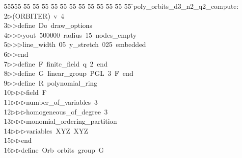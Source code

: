 %
%
\begin{tabbing}
55555 \= 55 \= 55 \= 55 \= 55 \= 55 \= 55 \= 55 \= 55 \= 55 \= 55 \= 55 \= 55 \= \>poly\_orbits\_d3\_n2\_q2\_compute:\\[0pt]
2\>$\triangleright$\>(ORBITER)\ v\ 4\ \\[0pt]
3\>$\triangleright$\>$\triangleright$\>define\ Do\ draw\_options\ \\[0pt]
4\>$\triangleright$\>$\triangleright$\>$\triangleright$\>yout\ 500000\ radius\ 15\ nodes\_empty\ \\[0pt]
5\>$\triangleright$\>$\triangleright$\>$\triangleright$\>line\_width\ 05\ y\_stretch\ 025\ embedded\ \\[0pt]
6\>$\triangleright$\>$\triangleright$\>end\ \\[0pt]
7\>$\triangleright$\>$\triangleright$\>define\ F\ finite\_field\ q\ 2\ end\ \\[0pt]
8\>$\triangleright$\>$\triangleright$\>define\ G\ linear\_group\ PGL\ 3\ F\ end\ \\[0pt]
9\>$\triangleright$\>$\triangleright$\>define\ R\ polynomial\_ring\ \\[0pt]
10\>$\triangleright$\>$\triangleright$\>$\triangleright$\>field\ F\ \\[0pt]
11\>$\triangleright$\>$\triangleright$\>$\triangleright$\>number\_of\_variables\ 3\ \\[0pt]
12\>$\triangleright$\>$\triangleright$\>$\triangleright$\>homogeneous\_of\_degree\ 3\ \\[0pt]
13\>$\triangleright$\>$\triangleright$\>$\triangleright$\>monomial\_ordering\_partition\ \\[0pt]
14\>$\triangleright$\>$\triangleright$\>$\triangleright$\>variables\ XYZ\ XYZ\ \\[0pt]
15\>$\triangleright$\>$\triangleright$\>end\ \\[0pt]
16\>$\triangleright$\>$\triangleright$\>define\ Orb\ orbits\ group\ G\ \\[0pt]

\end{tabbing}
